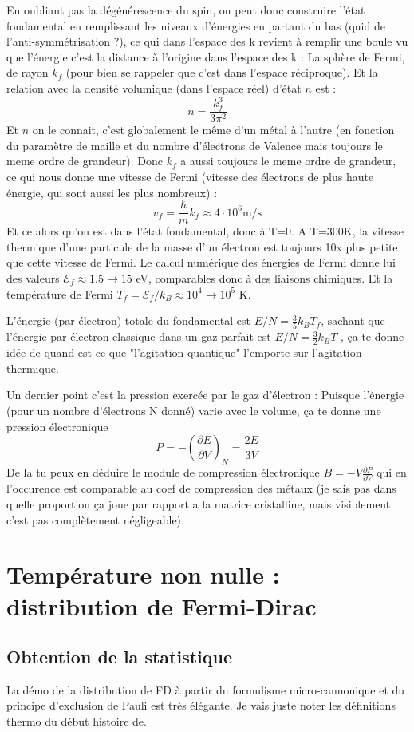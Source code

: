 \documentclass[a4paper]{report}
\begin{document}
 En oubliant pas la dégénérescence du spin, on peut donc construire l'état fondamental en remplissant les niveaux d'énergies en partant du bas (quid de l'anti-symmétrisation ?), ce qui dans l'espace des k revient à remplir une boule vu que l'énergie c'est la distance à l'origine dans l'espace des k : La sphère de Fermi, de rayon $k_f$ (pour bien se rappeler que c'est dans l'espace réciproque). Et la relation avec la densité volumique (dans l'espace réel) d'état $n$ est : $$n=\frac{k_f^3}{3\pi^2}$$ Et $n$ on le connait, c'est globalement le même d'un métal à l'autre (en fonction du paramètre de maille et du nombre d'électrons de Valence mais toujours le meme ordre de grandeur). Donc $k_f$ a aussi toujours le meme ordre de grandeur, ce qui nous donne une vitesse de Fermi (vitesse des électrons de plus haute énergie, qui sont aussi les plus nombreux) : $$ v_f = \frac{\hbar}{m} k_f \approx 4 \cdot 10^6 \mathrm{m/s} $$
 Et ce alors qu'on est dans l'état fondamental, donc à T=0. A T=300K, la vitesse thermique d'une particule de la masse d'un électron est toujours 10x plus petite que cette vitesse de Fermi. Le calcul numérique des énergies de Fermi donne lui des valeurs $\mathcal{E}_f \approx 1.5 \to 15 $ eV, comparables donc à des liaisons chimiques. Et la température de Fermi $T_f=\mathcal{E}_f/k_B \approx 10^4 \to 10^5$ K. 
 
 L'énergie (par électron) totale du fondamental est $E/N= \frac{3}{5} k_B T_f$, sachant que l'énergie par électron classique dans un gaz parfait est $E/N= \frac{3}{2} k_B T$ , ça te donne idée de quand est-ce que "l'agitation quantique" l'emporte sur l'agitation thermique.
 
 Un dernier point c'est la pression exercée par le gaz d'électron : Puisque l'énergie (pour un nombre d'électrons N donné) varie avec le volume, ça te donne une pression électronique$$P=-\left(\frac{\partial E}{\partial V}\right)_N=\frac{2E}{3V}$$ De la tu peux en déduire le module de compression électronique $B=-V\frac{\partial P}{\partial V}$ qui en l'occurence est comparable au coef de compression des métaux (je sais pas dans quelle proportion ça joue par rapport a la matrice cristalline, mais visiblement c'est pas complètement négligeable).
 
 \section{Température non nulle : distribution de Fermi-Dirac}
 
 \subsection{Obtention de la statistique}
 La démo de la distribution de FD à partir du formulisme micro-cannonique et du principe d'exclusion de Pauli est très élégante. Je vais juste noter les définitions thermo du début histoire de.
 
\end{document}
